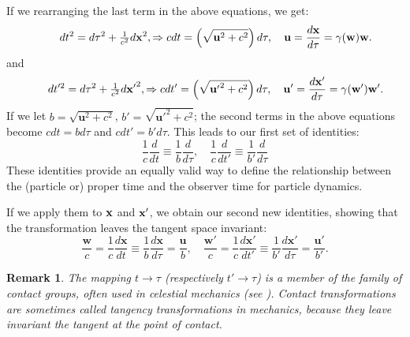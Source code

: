 \documentclass[11pt, reqno]{amsart}
\newcommand{\lb}{\label}
\newtheorem{rem}[thm]{Remark}
\numberwithin{equation}{section}
\begin{document}
If we rearranging the last term in the above equations, we get:
\begin{equation}\lb{c}
\quad \quad d{t^2} = d{\tau^2} + \tfrac{1}{{{c^2}}}d{{\mathbf{x}}^2}, \Rightarrow cdt = \left( {\sqrt {{{\mathbf{u}}^2} + {c^2}} } \right)d\tau ,\quad {\mathbf{u}} = \frac{{d{\mathbf{x}}}}{{d\tau }}= {\gamma}({\bf{w}}){{\mathbf{w}}}.
\end{equation}
and
\begin{equation}\lb{d}
\quad \quad d{t'^2} = d{\tau^2} + \tfrac{1}{{{c^2}}}d{{\mathbf{x}'}^2}, \Rightarrow cdt' = \left( {\sqrt {{{\mathbf{u}'}^2} + {c^2}} } \right)d\tau ,\quad {\mathbf{u}'} = \frac{{d{\mathbf{x}'}}}{{d\tau }}= {\gamma}({\bf{w}'}){{\mathbf{w}'}}.
\end{equation}
If we let $b={\sqrt {{{\mathbf{u}}^2} + {c^2}} }$, $b'={\sqrt {{{\mathbf{u}'}^2} + {c^2}} }$; the second terms in the above equations become $cdt =bd\tau$ and $cdt' =b'd\tau$.  This leads to our first set of identities:
\begin{equation}\label{e}
\frac{1}{c}\frac{d}{{dt}} \equiv \frac{1}{{{b}}}\frac{d}{{d{\tau}}}, \quad \frac{1}{c}\frac{d}{{dt'}} \equiv \frac{1}{{{b'}}}\frac{d}{{d{\tau}}}
\end{equation}
These identities provide an  equally valid way to define the relationship between the (particle or) proper time and the observer time for particle dynamics. 

If we apply them to ${\bf{x}}$ and ${\bf{x}'}$, we obtain our second new identities, showing that the transformation leaves the tangent space invariant:
\begin{equation}\label{f}
\frac{{{{\mathbf{w}}}}}{c} = \frac{1}{c}\frac{{d{{\mathbf{x}}}}}{{dt}} \equiv \frac{1}{{{b}}}\frac{{d{{\mathbf{x}}}}}{{d\tau }} = \frac{{{{\mathbf{u}}}}}{{{b}}}, \quad \frac{{{{\mathbf{w}'}}}}{c} = \frac{1}{c}\frac{{d{{\mathbf{x}'}}}}{{dt'}} \equiv \frac{1}{{{b'}}}\frac{{d{{\mathbf{x}'}}}}{{d\tau }} = \frac{{{{\mathbf{u}'}}}}{{{b'}}}. 
\end{equation}

  
\begin{rem} The mapping  $t \to \tau$ (respectively $t' \to \tau$) is a member of the family of contact groups, often used in celestial mechanics (see \cite{9}). Contact transformations are sometimes called tangency transformations in mechanics, because they leave invariant the tangent at the point of contact.    
\end{rem}
\end{document}
